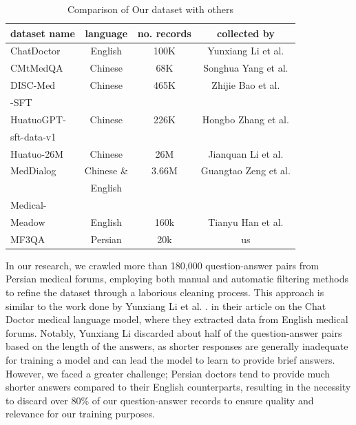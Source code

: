 \documentclass[conference]{IEEEtran}
\begin{document}
	\begin{table}[ht]
		\centering
		\caption{Comparison of Our dataset with others}
		\begin{tabular}{|l|c|c|c|}  %
			\hline
			dataset name            &language & no. records & collected by \\ \hline
			ChatDoctor 	   &English	 & 100K        & Yunxiang Li et al.
			\cite{b6}
			\\ \hline
			CMtMedQA  	   &Chinese	 & 68K        &  Songhua Yang et al.
			\cite{b21}
			\\ \hline
			DISC-Med	   &Chinese	 & 465K       & Zhijie Bao et al.   
			\cite{b22}
			\\ 
			-SFT       & &  &  \\ \hline
			HuatuoGPT-	   &Chinese	 & 226K        & Hongbo Zhang et al.   
			\cite{b23}
			\\ 
			sft-data-v1	   &	     &             & 	\\ \hline
			Huatuo-26M	   &Chinese	 & 26M         & Jianquan Li et al.
			\cite{b24}
			\\ \hline
			MedDialog       &Chinese \&&3.66M       & Guangtao Zeng et al.  \\ 
			&English  &             &  \cite{b25} \\ \hline
			Medical-       & &  &  \\
			Meadow  &English  & 160k        & Tianyu Han et al. 
			\cite{b26}
			\\ \hline
			MF3QA           &Persian  & 20k            & us \\ \hline
		\end{tabular}
		\label{tab:mf3qa_comparisin}
	\end{table}
	
	
	In our research, we crawled more than 180,000 question-answer pairs from Persian medical forums, employing both manual and automatic filtering methods to refine the dataset through a laborious cleaning process. This approach is similar to the work done by Yunxiang Li et al.
	\cite{b6}.
	in their article on the Chat Doctor medical language model, where they extracted data from English medical forums. Notably, Yunxiang Li discarded about half of the question-answer pairs based on the length of the answers, as shorter responses are generally inadequate for training a model and can lead the model to learn to provide brief answers. However, we faced a greater challenge; Persian doctors tend to provide much shorter answers compared to their English counterparts, resulting in the necessity to discard over 80\% of our question-answer records to ensure quality and relevance for our training purposes.
	
\end{document}
